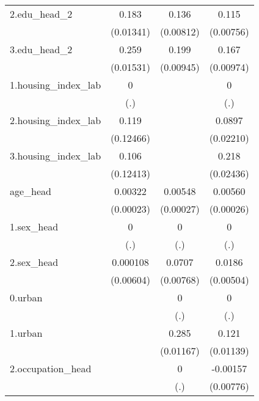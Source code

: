 \begin{table}[htbp]
{\begin{tabular}{l*{3}{c}}
2.edu_head_2&       0.183\sym{***}&       0.136\sym{***}&       0.115\sym{***}\\
            &   (0.01341)         &   (0.00812)         &   (0.00756)         \\
3.edu_head_2&       0.259\sym{***}&       0.199\sym{***}&       0.167\sym{***}\\
            &   (0.01531)         &   (0.00945)         &   (0.00974)         \\
1.housing_index_lab&           0         &                     &           0         \\
            &         (.)         &                     &         (.)         \\
2.housing_index_lab&       0.119         &                     &      0.0897\sym{***}\\
            &   (0.12466)         &                     &   (0.02210)         \\
3.housing_index_lab&       0.106         &                     &       0.218\sym{***}\\
            &   (0.12413)         &                     &   (0.02436)         \\
age_head    &     0.00322\sym{***}&     0.00548\sym{***}&     0.00560\sym{***}\\
            &   (0.00023)         &   (0.00027)         &   (0.00026)         \\
1.sex_head  &           0         &           0         &           0         \\
            &         (.)         &         (.)         &         (.)         \\
2.sex_head  &    0.000108         &      0.0707\sym{***}&      0.0186\sym{***}\\
            &   (0.00604)         &   (0.00768)         &   (0.00504)         \\
0.urban     &                     &           0         &           0         \\
            &                     &         (.)         &         (.)         \\
1.urban     &                     &       0.285\sym{***}&       0.121\sym{***}\\
            &                     &   (0.01167)         &   (0.01139)         \\
2.occupation_head&                     &           0         &    -0.00157         \\
            &                     &         (.)         &   (0.00776)         \\

\end{tabular}}
\end{table}

